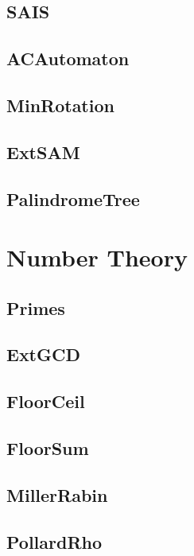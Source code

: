 	\subsection{SAIS}
	
	\subsection{ACAutomaton}
	
	\subsection{MinRotation}
	
	\subsection{ExtSAM}
	
	\subsection{PalindromeTree}
	
\section{Number Theory}
	\subsection{Primes}
	
	\subsection{ExtGCD}
	
	\subsection{FloorCeil}
	
	\subsection{FloorSum}
	
	
	\subsection{MillerRabin}
	
	\subsection{PollardRho}
	
